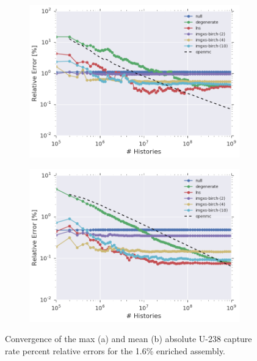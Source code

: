 \begin{figure}[h!]
\centering
\begin{subfigure}{\textwidth}
  \centering
  \includegraphics[width=0.9\linewidth]{figures/results/convergence/assm-16/max-capt-err-evo}
  \caption{}
  \label{fig:chap11-assm-1.6-capture-converge-max}
\end{subfigure}
\begin{subfigure}{\textwidth}
  \centering
  \includegraphics[width=0.9\linewidth]{figures/results/convergence/assm-16/mean-capt-err-evo}
  \caption{}
  \label{fig:chap11-assm-1.6-capture-converge-mean}
\end{subfigure}
\vspace{2mm}
\caption[U-238 capture rate error convergence with MC histories]{Convergence of the max (a) and mean (b) absolute U-238 capture rate percent relative errors for the 1.6\% enriched assembly.}
\label{fig:chap11-assm-1.6-capture-converge}
\end{figure}

